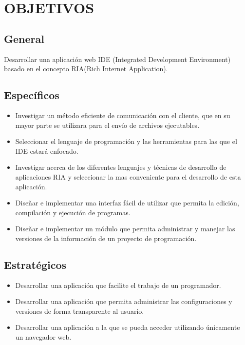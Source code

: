 \section{OBJETIVOS}

\subsection{General}

Desarrollar una aplicación web IDE (Integrated Development Environment) basado en el concepto RIA(Rich Internet Application).

\subsection{Específicos}

\begin{itemize}
	
	\item Investigar un método eficiente de comunicación con el cliente, que en su mayor parte se utilizara para el envío de archivos ejecutables.
	
	\item Seleccionar el lenguaje de programación y las herramientas para las que el IDE estará enfocado.
	
	\item Investigar acerca de los diferentes lenguajes y técnicas de desarrollo de aplicaciones RIA y seleccionar la mas conveniente para el desarrollo de esta aplicación.
	
	\item Diseñar e implementar una interfaz fácil de utilizar que permita la edición, compilación y ejecución de programas.
	
	\item Diseñar e implementar un módulo que permita administrar y manejar las versiones de la información de un proyecto de programación.
	
\end{itemize}


\subsection{Estratégicos}

\begin{itemize}

	\item Desarrollar una aplicación que facilite el trabajo de un programador.
	
	\item Desarrollar una aplicación que permita administrar las configuraciones y versiones de forma transparente al usuario.
	
	\item Desarrollar una aplicación a la que se pueda acceder utilizando únicamente un navegador web.
	
\end{itemize}
